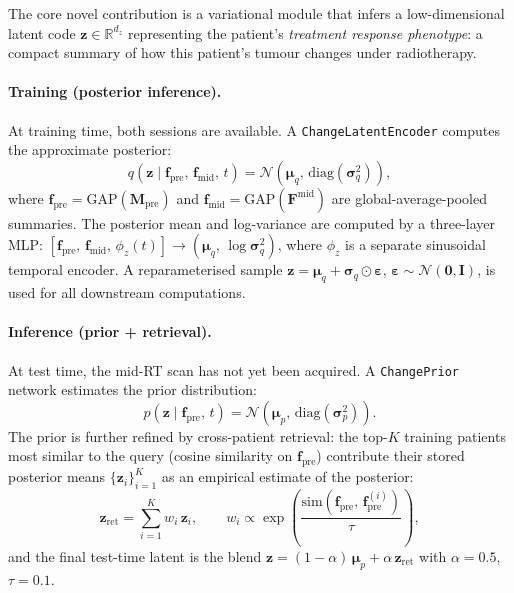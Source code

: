 The core novel contribution is a variational module that infers a
low-dimensional latent code $\mathbf{z} \in \mathbb{R}^{d_z}$ representing the
patient's \emph{treatment response phenotype}: a compact summary of how this
patient's tumour changes under radiotherapy.

\paragraph{Training (posterior inference).}
At training time, both sessions are available.  A
\texttt{ChangeLatentEncoder} computes the approximate posterior:
\begin{equation}
  q(\mathbf{z} \mid \mathbf{f}_{\text{pre}},\, \mathbf{f}_{\text{mid}},\, t)
  = \mathcal{N}\!\left(\boldsymbol{\mu}_q,\, \mathrm{diag}(\boldsymbol{\sigma}_q^2)\right),
\end{equation}
where $\mathbf{f}_{\text{pre}} = \mathrm{GAP}(\mathbf{M}_{\text{pre}})$ and
$\mathbf{f}_{\text{mid}} = \mathrm{GAP}(\mathbf{F}^{\text{mid}})$ are
global-average-pooled summaries.
The posterior mean and log-variance are computed by a three-layer MLP:
$[\mathbf{f}_{\text{pre}},\,\mathbf{f}_{\text{mid}},\,\phi_z(t)] \to
(\boldsymbol{\mu}_q,\, \log\boldsymbol{\sigma}_q^2)$,
where $\phi_z$ is a separate sinusoidal temporal encoder.
A reparameterised sample $\mathbf{z} = \boldsymbol{\mu}_q + \boldsymbol{\sigma}_q \odot \boldsymbol{\varepsilon}$,
$\boldsymbol{\varepsilon} \sim \mathcal{N}(\mathbf{0}, \mathbf{I})$, is used
for all downstream computations.

\paragraph{Inference (prior + retrieval).}
At test time, the mid-RT scan has not yet been acquired.  A
\texttt{ChangePrior} network estimates the prior distribution:
\begin{equation}
  p(\mathbf{z} \mid \mathbf{f}_{\text{pre}},\, t)
  = \mathcal{N}\!\left(\boldsymbol{\mu}_p,\, \mathrm{diag}(\boldsymbol{\sigma}_p^2)\right).
\end{equation}
The prior is further refined by cross-patient retrieval: the top-$K$
training patients most similar to the query (cosine similarity on
$\mathbf{f}_{\text{pre}}$) contribute their stored posterior means
$\{\mathbf{z}_i\}_{i=1}^K$ as an empirical estimate of the posterior:
\begin{equation}
  \mathbf{z}_{\text{ret}} = \sum_{i=1}^{K} w_i\, \mathbf{z}_i,
  \qquad
  w_i \propto \exp\!\left(\frac{\mathrm{sim}(\mathbf{f}_{\text{pre}},\, \mathbf{f}_{\text{pre}}^{(i)})}{\tau}\right),
\end{equation}
and the final test-time latent is the blend
$\mathbf{z} = (1-\alpha)\,\boldsymbol{\mu}_p + \alpha\,\mathbf{z}_{\text{ret}}$
with $\alpha = 0.5$, $\tau = 0.1$.

